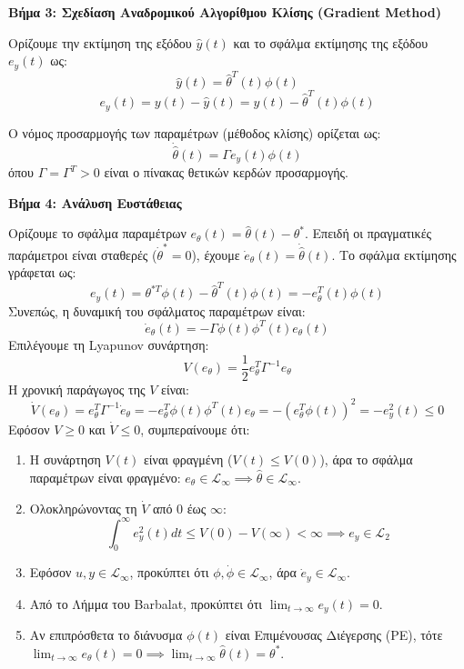 \documentclass[a4paper,11pt]{article}
\begin{document}
\begin{answer}
\textbf{Βήμα 3: Σχεδίαση Αναδρομικού Αλγορίθμου Κλίσης (Gradient Method)}

Ορίζουμε την εκτίμηση της εξόδου $\hat{y}(t)$ και το σφάλμα εκτίμησης της εξόδου $e_y(t)$ ως:
\[ \hat{y}(t) = \hat{\theta}^T(t) \phi(t) \]
\[ e_y(t) = y(t) - \hat{y}(t) = y(t) - \hat{\theta}^T(t) \phi(t) \]

Ο νόμος προσαρμογής των παραμέτρων (μέθοδος κλίσης) ορίζεται ως:
\[ \dot{\hat{\theta}}(t) = \Gamma e_y(t) \phi(t) \]
όπου $\Gamma = \Gamma^T > 0$ είναι ο πίνακας θετικών κερδών προσαρμογής.

\textbf{Βήμα 4: Ανάλυση Ευστάθειας}

Ορίζουμε το σφάλμα παραμέτρων $e_\theta(t) = \hat{\theta}(t) - \theta^*$. Επειδή οι πραγματικές παράμετροι είναι σταθερές ($\dot{\theta}^* = 0$), έχουμε $\dot{e}_\theta(t) = \dot{\hat{\theta}}(t)$.
Το σφάλμα εκτίμησης γράφεται ως:
\[ e_y(t) = \theta^{*T} \phi(t) - \hat{\theta}^T(t) \phi(t) = -e_\theta^T(t) \phi(t) \]
Συνεπώς, η δυναμική του σφάλματος παραμέτρων είναι:
\[ \dot{e}_\theta(t) = -\Gamma \phi(t) \phi^T(t) e_\theta(t) \]
Επιλέγουμε τη Lyapunov συνάρτηση:
\[ V(e_\theta) = \frac{1}{2} e_\theta^T \Gamma^{-1} e_\theta \]
Η χρονική παράγωγος της $V$ είναι:
\[ \dot{V}(e_\theta) = e_\theta^T \Gamma^{-1} \dot{e}_\theta = -e_\theta^T \phi(t) \phi^T(t) e_\theta = -(e_\theta^T \phi(t))^2 = -e_y^2(t) \le 0 \]
Εφόσον $V \ge 0$ και $\dot{V} \le 0$, συμπεραίνουμε ότι:
\begin{enumerate}
    \item Η συνάρτηση $V(t)$ είναι φραγμένη ($V(t) \le V(0)$), άρα το σφάλμα παραμέτρων είναι φραγμένο: $e_\theta \in \mathcal{L}_\infty \implies \hat{\theta} \in \mathcal{L}_\infty$.
    \item Ολοκληρώνοντας τη $\dot{V}$ από $0$ έως $\infty$:
    \[ \int_0^\infty e_y^2(t) dt \le V(0) - V(\infty) < \infty \implies e_y \in \mathcal{L}_2 \]
    \item Εφόσον $u, y \in \mathcal{L}_\infty$, προκύπτει ότι $\phi, \dot{\phi} \in \mathcal{L}_\infty$, άρα $\dot{e}_y \in \mathcal{L}_\infty$.
    \item Από το Λήμμα του Barbalat, προκύπτει ότι $\lim_{t \to \infty} e_y(t) = 0$.
    \item Αν επιπρόσθετα το διάνυσμα $\phi(t)$ είναι Επιμένουσας Διέγερσης (PE), τότε $\lim_{t \to \infty} e_\theta(t) = 0 \implies \lim_{t \to \infty} \hat{\theta}(t) = \theta^*$.
\end{enumerate}
\end{answer}
\end{document}
